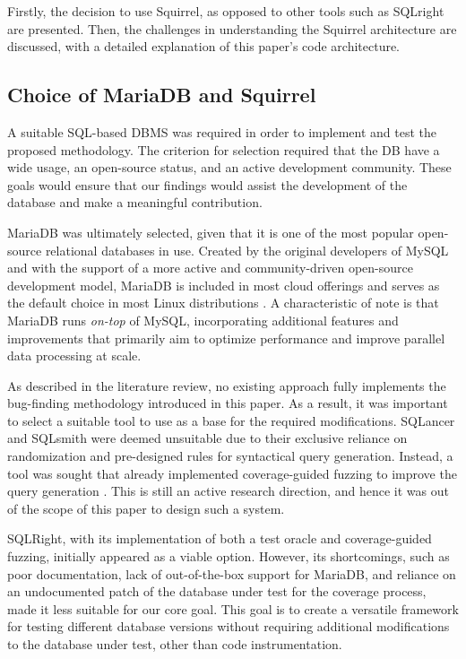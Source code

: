 \documentclass[sigconf]{acmart}
\begin{document}
Firstly, the decision to use Squirrel, as opposed to other tools such as SQLright are presented. Then, the challenges in understanding the Squirrel architecture are discussed, with a detailed explanation of this paper's code architecture.

\subsection{Choice of MariaDB and Squirrel}

A suitable SQL-based DBMS was required in order to implement and test the proposed methodology. The criterion for selection required that the DB have a wide usage, an open-source status, and an active development community. These goals would ensure that our findings would assist the development of the database and make a meaningful contribution.

MariaDB was ultimately selected, given that it is one of the most popular open-source relational databases in use. Created by the original developers of MySQL and with the support of a more active and community-driven open-source development model, MariaDB is included in most cloud offerings and serves as the default choice in most Linux distributions . A characteristic of note is that MariaDB runs \textit{on-top} of MySQL, incorporating additional features and improvements that primarily aim to optimize performance and improve parallel data processing at scale.

As described in the literature review, no existing approach fully implements the bug-finding methodology introduced in this paper. As a result, it was important to select a suitable tool to use as a base for the required modifications. SQLancer and SQLsmith were deemed unsuitable due to their exclusive reliance on randomization and pre-designed rules for syntactical query generation. Instead, a tool was sought that already implemented coverage-guided fuzzing to improve the query generation . This is still an active research direction, and hence it was out of the scope of this paper to design such a system.

SQLRight, with its implementation of both a test oracle and coverage-guided fuzzing, initially appeared as a viable option. However, its shortcomings, such as poor documentation, lack of out-of-the-box support for MariaDB, and reliance on an undocumented patch of the database under test for the coverage process, made it less suitable for our core goal. This goal is to create a versatile framework for testing different database versions without requiring additional modifications to the database under test, other than code instrumentation.
\end{document}
